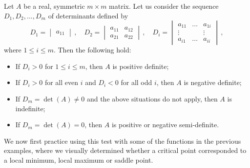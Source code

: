  \begin{theorem}
 \label{CQFUD}
Let $A$ be a real, symmetric $m \times m$ matrix. Let us consider the sequence $D_1,D_2,...,D_m$ of determinants defined by
$$D_1 = \begin{vmatrix} a_{11} \end{vmatrix} \,, \quad  D_2 = \begin{vmatrix} a_{11} & a_{12}  \\ a_{21} & a_{22} \end{vmatrix} \,, \quad  D_i = \begin{vmatrix} a_{11} & \ldots & a_{1i} \\ \vdots& &\vdots \\ a_{i1} & \ldots &  a_{ii} \end{vmatrix} \,,$$ 
where $1 \leq i \leq m$. Then the following hold:
\begin{itemize}
\item If $D_i > 0$ for $1 \leq i \leq m$, then $A$ is positive definite;
\item If $D_i > 0$ for all even $i$ and $D_i < 0$ for all odd $i$, then $A$ is negative definite;
\item If $D_m = \det(A) \neq 0$ and the above situations do not apply, then $A$ is indefinite; 
\item If $D_m = \det(A) = 0$, then $A$ is positive or negative semi-definite.  
\end{itemize}
\end{theorem}

 
 We now first practice using this test with some of the functions in the previous examples, where we visually determined whether a critical point corresponded to a local minimum, local maximum or saddle point. 
 
